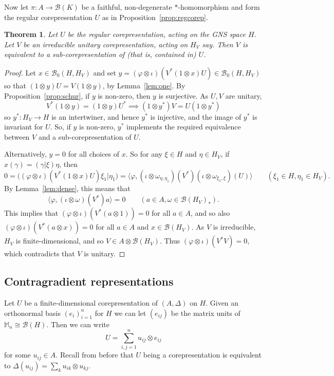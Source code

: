 \documentclass[twoside,a4paper,12pt]{article}
\theoremstyle{plain}
\newtheorem{theorem}[proposition]{Theorem}
\theoremstyle{definition}
\newcommand{\ip}[2]{\langle #1,#2 \rangle}
\newcommand{\mc}{\mathcal}
\begin{document}
Now let $\pi:A\rightarrow\mc B(K)$ be a faithful, non-degenerate
$*$-homomorphism and form the regular corepresentation $U$ as in
Proposition~\ref{prop:regcorep}.

\begin{theorem}\label{thm:lrcontains}
Let $U$ be the regular corepresentation, acting on the GNS space $H$.
Let $V$ be an irreducible unitary corepresentation, acting on $H_V$ say.
Then $V$ is equivalent to a sub-corepresentation of (that is,
\emph{contained in}) $U$.
\end{theorem}
\begin{proof}
Let $x\in\mc B_0(H,H_V)$ and set $y=(\varphi\otimes\iota)(V^*(1\otimes x)U)
\in \mc B_0(H,H_V)$ so that $(1\otimes y)U = V(1\otimes y)$, by
Lemma~\ref{lem:one}.  By Proposition~\ref{prop:schur}, if $y$ is non-zero,
then $y$ is surjective.  As $U,V$ are unitary,
\[ V^*(1\otimes y) = (1\otimes y)U^* \implies
(1\otimes y^*) V  =  U (1\otimes y^*) \]
so $y^*:H_V\rightarrow H$ is an intertwiner, and hence $y^*$ is injective,
and the image of $y^*$ is invariant for $U$.  So, if $y$ is non-zero, $y^*$
implements the required equivalence between $V$ and a sub-corepresentation
of $U$.

Alternatively, $y=0$ for all choices of $x$.
So for any $\xi\in H$ and $\eta\in H_V$,
if $x(\gamma) = (\gamma|\xi)\eta$, then
\[ 0 = \big( (\varphi\otimes\iota)(V^*(1\otimes x)U) \xi_1 \big| \eta_1 \big)
= \ip{\varphi}{(\iota\otimes\omega_{\eta,\eta_1})(V^*)
(\iota\otimes\omega_{\xi_1,\xi})(U)}
\qquad (\xi_1\in H, \eta_1\in H_V). \]
By Lemma~\ref{lem:dense}, this means that
\[ \ip{\varphi}{(\iota\otimes\omega)(V^*)a} = 0
\qquad (a\in A, \omega\in\mc B(H_V)_*). \]
This implies that $(\varphi\otimes\iota)(V^*(a\otimes 1))=0$ for all $a\in A$,
and so also $(\varphi\otimes\iota)(V^*(a\otimes x))=0$ for all $a\in A$ and
$x\in\mc B(H_V)$.  As $V$ is irreducible, $H_V$ is finite-dimensional,
and so $V\in A\otimes\mc B(H_V)$.  Thus $(\varphi\otimes\iota)(V^*V)=0$,
which contradicts that $V$ is unitary.
\end{proof}



\subsection{Contragradient representations}

Let $U$ be a finite-dimensional corepresentation of $(A,\Delta)$ on $H$.
Given an orthonormal basis $(e_i)_{i=1}^n$ for $H$ we can let $(e_{ij})$ be
the matrix units of $\mathbb M_n \cong\mc B(H)$.  Then we can write
\[ U = \sum_{i,j=1}^n u_{ij} \otimes e_{ij} \]
for some $u_{ij}\in A$.  Recall from before that $U$ being a corepresentation
is equivalent to $\Delta(u_{ij}) = \sum_k u_{ik} \otimes u_{kj}$.
\end{document}
